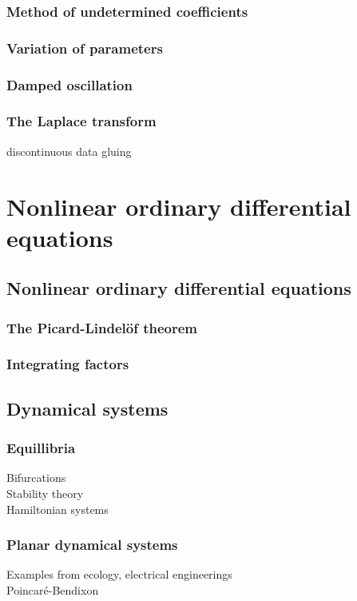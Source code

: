 \documentclass{../note}
\begin{document}
\section{Method of undetermined coefficients}
\section{Variation of parameters}
\section{Damped oscillation}
\section{The Laplace transform}
discontinuous data gluing








\part{Nonlinear ordinary differential equations}

\chapter{Nonlinear ordinary differential equations}
\section{The Picard-Lindel\"of theorem}
\section{Integrating factors}

\chapter{Dynamical systems}
\section{Equillibria}
Bifurcations\\
Stability theory\\
Hamiltonian systems

\section{Planar dynamical systems}
Examples from ecology, electrical engineerings\\
Poincar\'e-Bendixon
\end{document}
